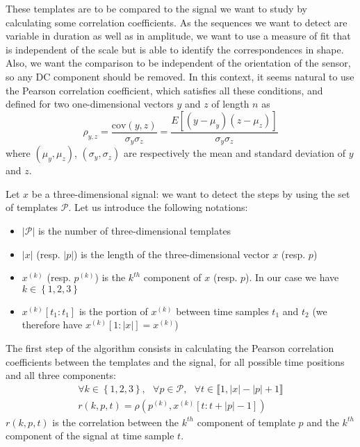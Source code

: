 \documentclass[../thesis.tex]{subfiles}
\begin{document}
These templates are to be compared to the signal we want to study by calculating some correlation coefficients. As the sequences we want to detect are variable in duration as well as in amplitude, we want to use a measure of fit that is independent of the scale but is able to identify the correspondences in shape. Also, we want the comparison to be independent of the orientation of the sensor, so any DC component should be removed. In this context, it seems natural to use the Pearson correlation coefficient, which satisfies all these conditions, and defined for two one-dimensional vectors $y$ and $z$ of length $n$ as
\begin{equation}
    \rho_{y,z}=\frac{\mathrm{cov}(y,z)}{\sigma_y \sigma_z} =\frac{E[(y-\mu_y)(z-\mu_z)]}{\sigma_y\sigma_z} 
\label{eq:pear}
\end{equation} 
where $(\mu_y,\mu_z)$,  $(\sigma_y,\sigma_z)$ are respectively the mean and standard deviation of $y$ and $z$.



Let $x$ be a three-dimensional signal: we want to detect the steps by using the set of templates $\mathcal{P}$. Let us introduce the following notations:
\begin{itemize}
\item $|\mathcal{P}|$ is the number of three-dimensional templates
\item $|x|$ (resp. $|p|$) is the length of the three-dimensional vector $x$ (resp. $p$)
 \item $x^{(k)}$ (resp. $p^{(k)}$) is the $k^{th}$ component of $x$ (resp. $p$). In our case we have $k \in \left\lbrace 1, 2,  3\right\rbrace $
\item $x^{(k)}[t_1 : t_1]$ is the portion of $x^{(k)}$ between time samples $t_1$ and $t_2$ (we therefore have $x^{(k)}[1 : |x|] = x^{(k)}$)
\end{itemize}


The first step of the algorithm consists in calculating the Pearson correlation coefficients between the templates and the signal, for all possible time positions and all three components:
\begin{equation}
\begin{split}
 \forall k \in \left\lbrace 1, 2,  3\right\rbrace, \ \ \ \forall p \in \mathcal{P}, \ \ \ \forall t \in \llbracket 1, |x|-|p|+1 \rrbracket\\  r(k,p,t)= \rho \left( p^{(k)},x^{(k)}[t : t+|p|-1]\right) 
\end{split}
\end{equation}
$r(k,p,t)$ is the correlation between the $k^{th}$ component of template $p$ and the  $k^{th}$ component of the signal at time sample $t$.
\end{document}
